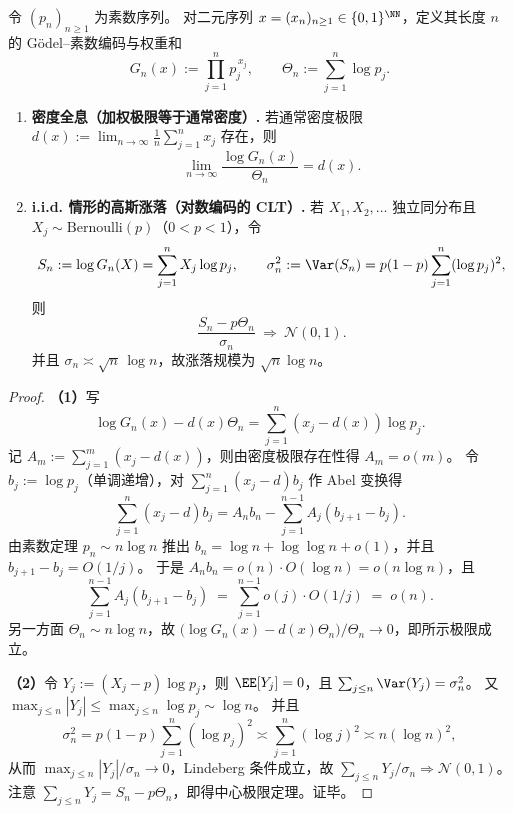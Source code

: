 \begin{theorem}\label{thm:spg-godel-prime-density-holography-clt}
令 \((p_n)_{n\ge 1}\) 为素数序列。
对二元序列 \(x=(x_n)_{n\ge 1}\in\{0,1\}^{\NN}\)，定义其长度 \(n\) 的 Gödel--素数编码与权重和
\[
G_n(x):=\prod_{j=1}^{n}p_j^{\,x_j},
\qquad
\Theta_n:=\sum_{j=1}^{n}\log p_j.
\]
\begin{enumerate}
  \item \textbf{密度全息（加权极限等于通常密度）.}
        若通常密度极限 \(d(x):=\lim_{n\to\infty}\frac1n\sum_{j=1}^n x_j\) 存在，则
        \[
        \lim_{n\to\infty}\frac{\log G_n(x)}{\Theta_n}=d(x).
        \]
  \item \textbf{i.i.d. 情形的高斯涨落（对数编码的 CLT）.}
        若 \(X_1,X_2,\dots\) 独立同分布且 \(X_j\sim \mathrm{Bernoulli}(p)\)（\(0<p<1\)），令
        \[
        S_n:=\log G_n(X)=\sum_{j=1}^n X_j\log p_j,
        \qquad
        \sigma_n^2:=\Var(S_n)=p(1-p)\sum_{j=1}^n (\log p_j)^2,
        \]
        则
        \[
        \frac{S_n-p\Theta_n}{\sigma_n}\ \Longrightarrow\ \mathcal N(0,1).
        \]
        并且 \(\sigma_n\asymp \sqrt n\,\log n\)，故涨落规模为 \(\sqrt n\log n\)。
\end{enumerate}
\end{theorem}
\begin{proof}
\textbf{（1）}写
\[
\log G_n(x)-d(x)\Theta_n=\sum_{j=1}^n (x_j-d(x))\log p_j.
\]
记 \(A_m:=\sum_{j=1}^m (x_j-d(x))\)，则由密度极限存在性得 \(A_m=o(m)\)。
令 \(b_j:=\log p_j\)（单调递增），对 \(\sum_{j=1}^n (x_j-d)b_j\) 作 Abel 变换得
\[
\sum_{j=1}^n (x_j-d)b_j=A_n b_n-\sum_{j=1}^{n-1}A_j(b_{j+1}-b_j).
\]
由素数定理 \(p_n\sim n\log n\) 推出 \(b_n=\log n+\log\log n+o(1)\)，并且 \(b_{j+1}-b_j=O(1/j)\)。
于是 \(A_n b_n=o(n)\cdot O(\log n)=o(n\log n)\)，且
\[
\sum_{j=1}^{n-1}A_j(b_{j+1}-b_j)
\;=\;
\sum_{j=1}^{n-1}o(j)\cdot O(1/j)
\;=\;
o(n).
\]
另一方面 \(\Theta_n\sim n\log n\)，故
\(
\bigl(\log G_n(x)-d(x)\Theta_n\bigr)/\Theta_n\to 0
\)，即所示极限成立。
\par
\textbf{（2）}令 \(Y_j:=(X_j-p)\log p_j\)，则 \(\EE[Y_j]=0\)，且 \(\sum_{j\le n}\Var(Y_j)=\sigma_n^2\)。
又 \(\max_{j\le n}|Y_j|\le \max_{j\le n}\log p_j\sim \log n\)。
并且
\[
\sigma_n^2=p(1-p)\sum_{j=1}^n(\log p_j)^2\asymp \sum_{j=1}^n(\log j)^2\asymp n(\log n)^2,
\]
从而 \(\max_{j\le n}|Y_j|/\sigma_n\to 0\)，Lindeberg 条件成立，故
\(
\sum_{j\le n}Y_j/\sigma_n\Rightarrow \mathcal N(0,1)
\)。
注意 \(\sum_{j\le n}Y_j=S_n-p\Theta_n\)，即得中心极限定理。证毕。
\end{proof}

